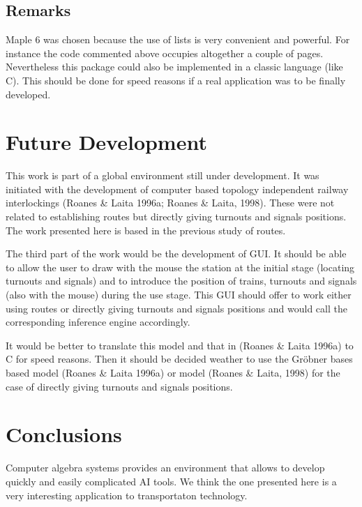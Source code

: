 \documentclass{article}
\begin{document}
\subsection{Remarks}

Maple 6 was chosen because the use of lists is very convenient and powerful. For 
instance the code commented above occupies altogether a couple of pages. Nevertheless 
this package could also be implemented in a classic language (like C). This should be 
done for speed reasons if a real application was to be finally developed.


\section{Future Development}

This work is part of a global environment still under development. It was initiated with 
the development of computer based topology independent railway interlockings (Roanes \& 
Laita 1996a; Roanes \& Laita, 1998). These were not related to establishing routes 
but directly giving turnouts and signals positions.
The work presented here is based in the previous study of routes.

The third part of the work would be the development of GUI. It should be able to allow 
the user to draw with the mouse the station at the initial stage (locating turnouts and 
signals) and to introduce the position of trains, turnouts and signals (also with the 
mouse) during the use stage. This GUI should offer to work either using routes or 
directly giving turnouts and signals positions and would call the corresponding 
inference engine accordingly.

It would be better to translate this model and that in (Roanes \& Laita 1996a) to C for 
speed reasons.
Then it should be decided weather to use the Gr\"obner bases based model (Roanes \& 
Laita 1996a) or model (Roanes \& Laita, 1998) for the case of directly giving turnouts 
and signals positions. 


\section{Conclusions}

Computer algebra systems provides an environment that allows to develop quickly and 
easily complicated AI tools.
We think the one presented here is a very interesting application to transportaton
technology.
\end{document}
